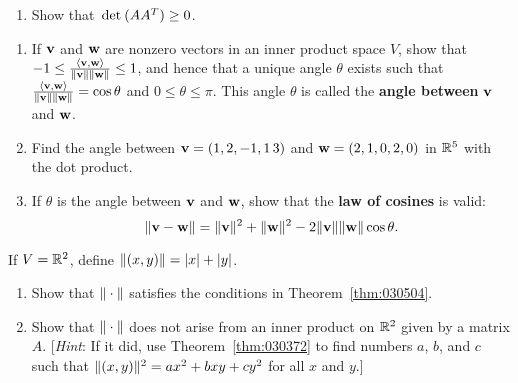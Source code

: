 \begin{multicols}{2}
\begin{ex}
\begin{enumerate}[label={\alph*.}]
\item Show that $\thinspace\operatorname{det\medspace}(AA^{T}) \geq 0$.

\end{enumerate}
\end{ex}

\begin{ex} \label{ex:10_1_31}
\begin{enumerate}[label={\alph*.}]
\item If $\textbf{v}$ and $\textbf{w}$ are nonzero vectors in an inner product space $V$, show that 
$-1 \leq \tfrac{\langle \textbf{v}, \textbf{w} \rangle}{\| \textbf{v} \| \| \textbf{w} \|} \leq 1$, and hence that a unique angle $\theta$ exists such that \newline $\tfrac{\langle \textbf{v}, \textbf{w} \rangle}{\| \textbf{v} \| \| \textbf{w} \|} = \cos \theta$ and $0 \leq \theta \leq \pi$. This angle $\theta$ is called the
\textbf{angle between} $\textbf{v}$ and $\textbf{w}$.

\item Find the angle between $\textbf{v} = (1, 2, -1, 1\, 3)$ and $\textbf{w} = (2, 1, 0, 2, 0)$ in $\mathbb{R}^5$ with the dot product.

\item If $\theta$ is the angle between $\textbf{v}$ and $\textbf{w}$, show that the \textbf{law of cosines} is valid:
\begin{equation*}
\| \textbf{v} - \textbf{w} \| = \| \textbf{v} \| ^2 + \| \textbf{w} \| ^2 - 2\| \textbf{v} \| \| \textbf{w} \| \cos \theta.
\end{equation*}
\end{enumerate}
\end{ex}

\begin{ex}
If $V = \mathbb{R}^2$, define $\|(x, y)\| = |x| + |y|$.

\begin{enumerate}[label={\alph*.}]
\item Show that $\|\cdot\|$ satisfies the conditions in Theorem~\ref{thm:030504}.

\item Show that $\|\cdot\|$ does not arise from an inner product on $\mathbb{R}^2$ given by a matrix $A$. [\textit{Hint}: If it did, use Theorem~\ref{thm:030372} to find numbers $a$, $b$, and $c$ such that $\|(x, y)\|^{2} = ax^{2} + bxy + cy^{2}$ for all $x$ and $y$.]

\end{enumerate}
\end{ex}
\end{multicols}
